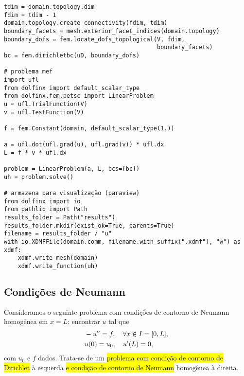 \begin{ex}
\begin{lstlisting}[caption=ex\_mef1d\_dirichlet.py]
tdim = domain.topology.dim
fdim = tdim - 1
domain.topology.create_connectivity(fdim, tdim)
boundary_facets = mesh.exterior_facet_indices(domain.topology)
boundary_dofs = fem.locate_dofs_topological(V, fdim,
                                            boundary_facets)
bc = fem.dirichletbc(uD, boundary_dofs)

# problema mef
import ufl
from dolfinx import default_scalar_type
from dolfinx.fem.petsc import LinearProblem
u = ufl.TrialFunction(V)
v = ufl.TestFunction(V)

f = fem.Constant(domain, default_scalar_type(1.))

a = ufl.dot(ufl.grad(u), ufl.grad(v)) * ufl.dx
L = f * v * ufl.dx

problem = LinearProblem(a, L, bcs=[bc])
uh = problem.solve()

# armazena para visualização (paraview)
from dolfinx import io
from pathlib import Path
results_folder = Path("results")
results_folder.mkdir(exist_ok=True, parents=True)
filename = results_folder / "u"
with io.XDMFFile(domain.comm, filename.with_suffix(".xdmf"), "w") as xdmf:
    xdmf.write_mesh(domain)
    xdmf.write_function(uh)
\end{lstlisting}
\end{ex}

\subsection{Condições de Neumann}
\badgeRevisar

Consideramos o seguinte problema com condições de contorno de Neumann{\neumann} homogênea em $x=L$: encontrar $u$ tal que
\begin{align}\hleq
  &-u'' = f,\quad \forall x\in I=[0, L],\label{eq:cc_n_eq}\\
  &u(0) = u_0,\quad u'(L) = 0,\label{eq:cc_n_bc}
\end{align}
com $u_0$ e $f$ dados. Trata-se de um \hl{problema com condição de contorno de Dirichlet} à esquerda \hl{e condição de contorno de Neumann}{\neumann} homogênea à direita.

